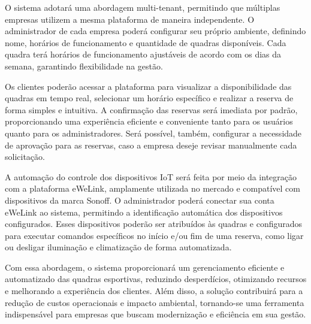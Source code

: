 O sistema adotará uma abordagem multi-tenant, permitindo que múltiplas empresas utilizem a mesma plataforma de maneira independente. O administrador de cada empresa poderá configurar seu próprio ambiente, definindo nome, horários de funcionamento e quantidade de quadras disponíveis. Cada quadra terá horários de funcionamento ajustáveis de acordo com os dias da semana, garantindo flexibilidade na gestão.

Os clientes poderão acessar a plataforma para visualizar a disponibilidade das quadras em tempo real, selecionar um horário específico e realizar a reserva de forma simples e intuitiva. A confirmação das reservas será imediata por padrão, proporcionando uma experiência eficiente e conveniente tanto para os usuários quanto para os administradores. Será possível, também, configurar a necessidade de aprovação para as reservas, caso a empresa deseje revisar manualmente cada solicitação.

A automação do controle dos dispositivos IoT será feita por meio da integração com a plataforma eWeLink, amplamente utilizada no mercado e compatível com dispositivos da marca Sonoff. O administrador poderá conectar sua conta eWeLink ao sistema, permitindo a identificação automática dos dispositivos configurados. Esses dispositivos poderão ser atribuídos às quadras e configurados para executar comandos específicos no início e/ou fim de uma reserva, como ligar ou desligar iluminação e climatização de forma automatizada.

Com essa abordagem, o sistema proporcionará um gerenciamento eficiente e automatizado das quadras esportivas, reduzindo desperdícios, otimizando recursos e melhorando a experiência dos clientes. Além disso, a solução contribuirá para a redução de custos operacionais e impacto ambiental, tornando-se uma ferramenta indispensável para empresas que buscam modernização e eficiência em sua gestão.
